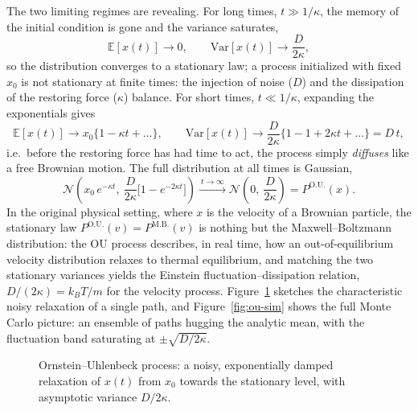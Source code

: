 The two limiting regimes are revealing.
For long times, $t\gg1/\kappa$, the memory of the initial condition is gone and the variance saturates,
\begin{equation}
\mathbb{E}[x(t)]\to0,\qquad \mathrm{Var}[x(t)]\to\frac{D}{2\kappa},
\end{equation}
so the distribution converges to a stationary law; a process initialized with fixed $x_0$ is not stationary at finite times: the injection of noise ($D$) and the dissipation of the restoring force ($\kappa$) balance.
For short times, $t\ll1/\kappa$, expanding the exponentials gives
\begin{equation}
\mathbb{E}[x(t)]\to x_0\{1-\kappa t+\dots\},\qquad \mathrm{Var}[x(t)]\to\frac{D}{2\kappa}\{1-1+2\kappa t+\dots\} = D\,t,
\end{equation}
i.e.\ before the restoring force has had time to act, the process simply \emph{diffuses} like a free Brownian motion.
The full distribution at all times is Gaussian,
\begin{equation}
\mathcal{N}\!\left(x_0\,e^{-\kappa t},\ \frac{D}{2\kappa}\big[1-e^{-2\kappa t}\big]\right) \xrightarrow{\ t\to\infty\ } \mathcal{N}\!\left(0,\ \frac{D}{2\kappa}\right) = P^{\mathrm{O.U.}}(x).
\end{equation}
In the original physical setting, where $x$ is the velocity of a Brownian particle, the stationary law $P^{\mathrm{O.U.}}(v) = P^{\mathrm{M.B.}}(v)$ is nothing but the Maxwell--Boltzmann distribution: the OU process describes, in real time, how an out-of-equilibrium velocity distribution relaxes to thermal equilibrium, and matching the two stationary variances yields the Einstein fluctuation--dissipation relation, $D/(2\kappa)=k_BT/m$ for the velocity process.
Figure~\ref{fig:ou} sketches the characteristic noisy relaxation of a single path, and Figure~\ref{fig:ou-sim} shows the full Monte Carlo picture: an ensemble of paths hugging the analytic mean, with the fluctuation band saturating at $\pm\sqrt{D/2\kappa}$.

\begin{figure}[h!]
\centering
{}
\caption{Ornstein--Uhlenbeck process: a noisy, exponentially damped relaxation of $x(t)$ from $x_0$ towards the stationary level, with asymptotic variance $D/2\kappa$.}
\label{fig:ou}
\end{figure}


